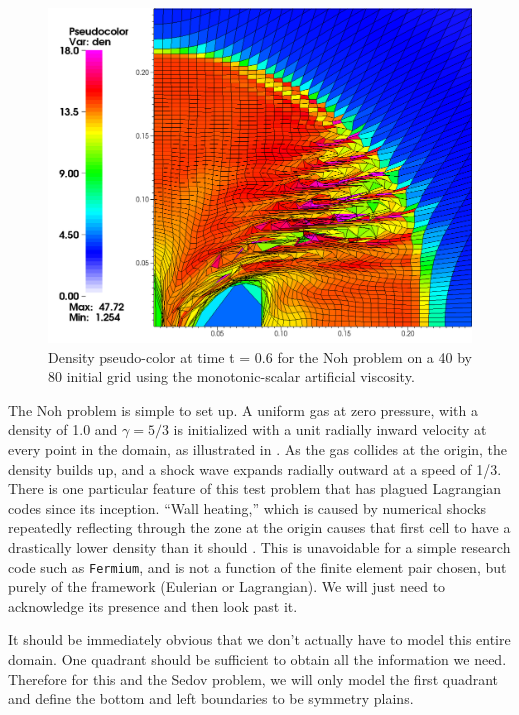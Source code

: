 \begin{figure}[h!]
 \centering
 \includegraphics[width=5in,keepaspectratio=true]{./Figures/Noh2D_MonoQ.png}
 \caption{Density pseudo-color at time t = 0.6 for the Noh problem on a 40 by 80 initial grid using the monotonic-scalar artiﬁcial viscosity.}
 \label{fig:Noh_MonoQ}
\end{figure}

The Noh problem is simple to set up. A uniform gas at zero pressure, with a density of 1.0 and $\gamma=5/3$ is initialized with a unit radially inward velocity at every point in the domain, as illustrated in . As the gas collides at the origin, the density builds up, and a shock wave expands radially outward at a speed of 1/3. There is one particular feature of this test problem that has plagued Lagrangian codes since its inception. ``Wall heating,'' which is caused by numerical shocks repeatedly reflecting through the zone at the origin causes that first cell to have a drastically lower density than it should \cite{Rider2000}. This is unavoidable for a simple research code such as \texttt{Fermium}, and is not a function of the finite element pair chosen, but purely of the framework (Eulerian or Lagrangian). We will just need to acknowledge its presence and then look past it.

It should be immediately obvious that we don't actually have to model this entire domain. One quadrant should be sufficient to obtain all the information we need. Therefore for this and the Sedov problem, we will only model the first quadrant and define the bottom and left boundaries to be symmetry plains. 

